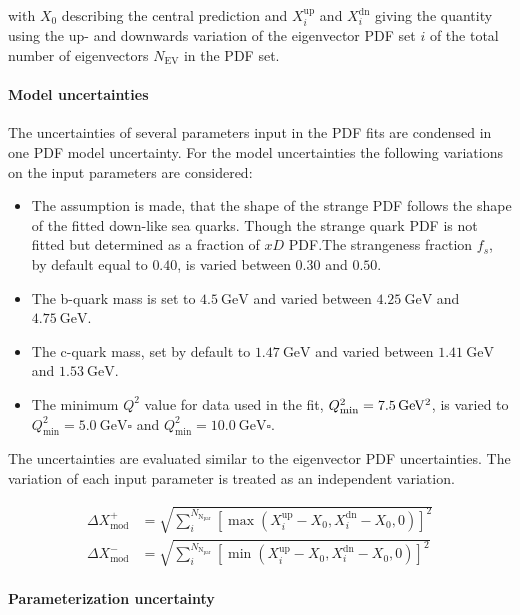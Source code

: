 with $X_0$ describing the central prediction and $X_i^{\mathrm{up}}$ and
$X_i^{\mathrm{dn}}$ giving the quantity using the up- and downwards variation of
the eigenvector PDF set $i$ of the total number of eigenvectors
$N_{\mathrm{EV}}$ in the PDF set.


\paragraph{Model uncertainties} The uncertainties of several parameters input in
the PDF fits are condensed in one PDF model uncertainty. For the model
uncertainties the following variations on the input parameters are considered:

\begin{itemize}
\item The assumption is made, that the shape of the strange PDF follows the
  shape of the fitted down-like sea quarks. Though the strange quark PDF is not
  fitted but determined as a fraction of $xD$ PDF.The strangeness fraction
  $f_s$, by default equal to $0.40$, is varied between $0.30$ and $0.50$.
  \item The b-quark mass is set to $\SI{4.5}{\GeV}$ and varied between
  $\SI{4.25}{\GeV}$ and $\SI{4.75}{\GeV}$.
  \item The c-quark mass, set by default to $\SI{1.47}{\GeV}$ and varied between
  $\SI{1.41}{\GeV}$ and $\SI{1.53}{\GeV}$.
  \item The minimum $Q^2$ value for data used in the fit,
    $Q^2_\mathrm{min}=\SI{7.5}{\GeVsq}$, is varied to $Q^2_\mathrm{min} =
    \SI{5.0}{\GeV\square}$ and $Q^2_\mathrm{min} = \SI{10.0}{\GeV\square}$.
\end{itemize}

The uncertainties are evaluated similar to the eigenvector PDF uncertainties.
The variation of each input parameter is treated as an independent variation.

\begin{align*}
  \Delta X^+_{\mathrm{mod}} &= \sqrt{\sum_i^{N_{\mathrm{N_{\mathrm{par}}}}} \left[ \max(X_i^{\mathrm{up}}
    -X_0, X_i^{\mathrm{dn}} - X_0, 0)\right]^2}\\
    \Delta X^-_{\mathrm{mod}} &= \sqrt{\sum_i^{N_{\mathrm{N_{\mathrm{par}}}}} \left[ \min(X_i^{\mathrm{up}} - X_0, X_i^{\mathrm{dn}} - X_0,0)\right]^2}
\end{align*}

\paragraph{Parameterization uncertainty}

